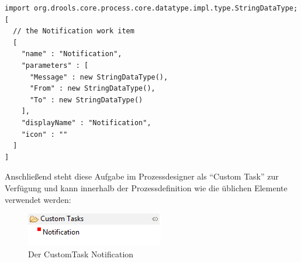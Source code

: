\begin{lstlisting}
import org.drools.core.process.core.datatype.impl.type.StringDataType;
[
  // the Notification work item
  [
    "name" : "Notification",
    "parameters" : [
      "Message" : new StringDataType(),
      "From" : new StringDataType(),
      "To" : new StringDataType()
    ],
    "displayName" : "Notification",
    "icon" : ""
  ]
]
\end{lstlisting}

Anschließend steht diese Aufgabe im Prozessdesigner als "`Custom Task"' zur Verfügung und kann innerhalb der Prozessdefinition wie die üblichen Elemente verwendet werden:

\begin{figure}[H]
\centering
\includegraphics[width=0.4\linewidth]{Bilder/NotificationCustomTask}
\caption{Der CustomTask Notification}
\label{fig:NotificationCustomTask}
\end{figure}


